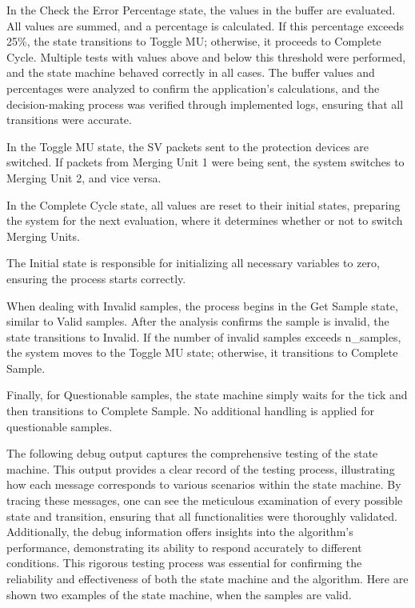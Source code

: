 In the Check the Error Percentage state, the values in the buffer are evaluated. All values are summed, and a percentage is calculated. If this percentage exceeds 25\%, the state transitions to Toggle MU; otherwise, it proceeds to Complete Cycle. Multiple tests with values above and below this threshold were performed, and the state machine behaved correctly in all cases. The buffer values and percentages were analyzed to confirm the application's calculations, and the decision-making process was verified through implemented logs, ensuring that all transitions were accurate.

In the Toggle MU state, the SV packets sent to the protection devices are switched. If packets from Merging Unit 1 were being sent, the system switches to Merging Unit 2, and vice versa.

In the Complete Cycle state, all values are reset to their initial states, preparing the system for the next evaluation, where it determines whether or not to switch Merging Units.

The Initial state is responsible for initializing all necessary variables to zero, ensuring the process starts correctly.

When dealing with Invalid samples, the process begins in the Get Sample state, similar to Valid samples. After the analysis confirms the sample is invalid, the state transitions to Invalid. If the number of invalid samples exceeds n\_samples, the system moves to the Toggle MU state; otherwise, it transitions to Complete Sample.

Finally, for Questionable samples, the state machine simply waits for the tick and then transitions to Complete Sample. No additional handling is applied for questionable samples.

The following debug output captures the comprehensive testing of the state machine. This output provides a clear record of the testing process, illustrating how each message corresponds to various scenarios within the state machine. By tracing these messages, one can see the meticulous examination of every possible state and transition, ensuring that all functionalities were thoroughly validated. Additionally, the debug information offers insights into the algorithm's performance, demonstrating its ability to respond accurately to different conditions. This rigorous testing process was essential for confirming the reliability and effectiveness of both the state machine and the algorithm. Here are shown two examples of the state machine, when the samples are valid.

